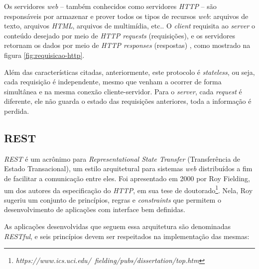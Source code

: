 Os servidores \textit{web} – também conhecidos como servidores \textit{HTTP} – são responsáveis por armazenar e prover todos os tipos de recursos \textit{web}: arquivos de texto, arquivos \textit{HTML}, arquivos de multimídia, etc.. O \textit{client} requisita ao \textit{server} o conteúdo desejado por meio de \textit{HTTP requests}  (requisições), e os servidores retornam os dados por meio de \textit{HTTP responses} (respostas) \cite{Gourley&Totty2002}, como mostrado na figura \ref{fig:requisicao-http}.

Além das características citadas, anteriormente, este protocolo é \textit{stateless}, ou seja, cada requisição é independente, mesmo que venham a ocorrer de forma simultânea e na mesma conexão cliente-servidor. Para o \textit{server}, cada \textit{request} é diferente, ele não guarda o estado das requisições anteriores, toda a informação é perdida.

\subsection{REST}

\textit{REST} é um acrônimo para \textit{Representational State Transfer} (Transferência de Estado Transacional), um estilo arquitetural para sistemas \textit{web} distribuídos a fim de facilitar a comunicação entre eles. Foi apresentado em 2000 por Roy Fielding, um dos autores da especificação do \textit{HTTP}, em sua tese de doutorado\footnote{\em https://www.ics.uci.edu/~fielding/pubs/dissertation/top.htm}. Nela, Roy sugeriu um conjunto de princípios, regras e \textit{constraints} que permitem o desenvolvimento de aplicações com interface bem definidas.
	
As aplicações desenvolvidas que seguem essa arquitetura são denominadas \textit{RESTful}, e seis princípios devem ser respeitados na implementação das mesmas:


